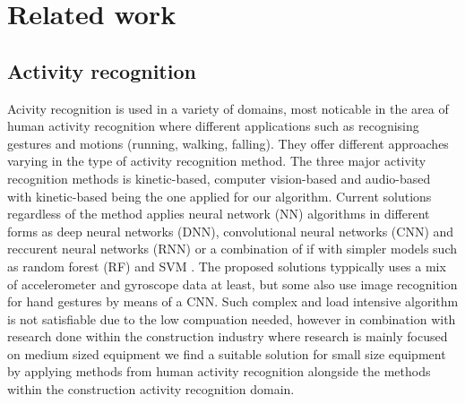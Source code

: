 \section{Related work}
\subsection{Activity recognition}
Acivity recognition is used in a variety of domains, most noticable in the area of human activity recognition where different applications such as recognising gestures and motions (running, walking, falling). 
They offer different approaches varying in the type of activity recognition method.
The three major activity recognition methods is kinetic-based, computer vision-based and audio-based  with kinetic-based being the one applied for our algorithm.
Current solutions regardless of the method applies neural network (NN) algorithms in different forms as deep neural networks (DNN), convolutional neural networks (CNN) and reccurent neural networks (RNN) or a combination of if with simpler models such as random forest (RF) and SVM . 
The proposed solutions typpically uses a mix of accelerometer and gyroscope data at least, but some also use image recognition for hand gestures by means of a CNN. 
Such complex and load intensive algorithm is not satisfiable due to the low compuation needed, however in combination with research done within the construction industry  where research is mainly focused on medium sized equipment we find a suitable solution for small size equipment by applying methods from human activity recognition alongside the methods within the construction activity recognition domain.

